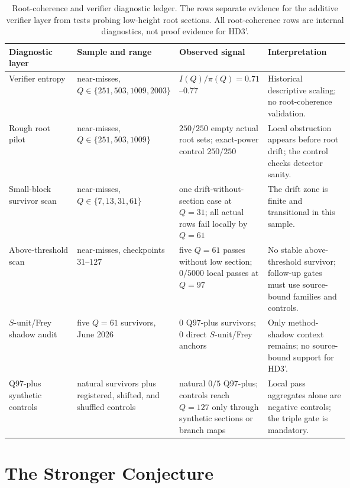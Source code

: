 \documentclass[11pt,a4paper]{article}
\begin{document}
\begin{table}[htb]
\centering
\small
\begin{tabularx}{\textwidth}{@{} >{\raggedright\arraybackslash}p{0.20\linewidth} >{\raggedright\arraybackslash}p{0.25\linewidth} >{\raggedright\arraybackslash}p{0.22\linewidth} >{\raggedright\arraybackslash}X @{}}
\toprule
Diagnostic layer & Sample and range & Observed signal & Interpretation \\
\midrule
Verifier entropy & 1000 near-misses, $Q\in\{251,503,1009,2003\}$ &
$I(Q)/\pi(Q)=0.71$--$0.77$ &
Historical descriptive scaling; no root-coherence validation. \\
\addlinespace
Rough root pilot & 250 near-misses, $Q\in\{251,503,1009\}$ &
$250/250$ empty actual root sets; exact-power control $250/250$ &
Local obstruction appears before root drift; the control checks detector sanity. \\
\addlinespace
Small-block survivor scan & 250 near-misses, $Q\in\{7,13,31,61\}$ &
one drift-without-section case at $Q=31$; all actual rows fail locally by $Q=61$ &
The drift zone is finite and transitional in this sample. \\
\addlinespace
Above-threshold scan & 5000 near-misses, checkpoints $31$--$127$ &
five $Q=61$ passes without low section; $0/5000$ local passes at $Q=97$ &
No stable above-threshold survivor; follow-up gates must use source-bound families and controls. \\
\addlinespace
$S$-unit/Frey shadow audit & five $Q=61$ survivors, June 2026 &
$0$ Q97-plus survivors; $0$ direct $S$-unit/Frey anchors &
Only method-shadow context remains; no source-bound support for HD3'. \\
\addlinespace
Q97-plus synthetic controls & natural survivors plus registered, shifted, and shuffled controls &
natural $0/5$ Q97-plus; controls reach $Q=127$ only through synthetic sections or branch maps &
Local pass aggregates alone are negative controls; the triple gate is mandatory. \\
\bottomrule
\end{tabularx}
\caption{Root-coherence and verifier diagnostic ledger. The rows separate
evidence for the additive verifier layer from tests probing low-height
root sections. All root-coherence rows are internal diagnostics, not
proof evidence for HD3'.}
\label{tab:root-diagnostics}
\end{table}

\section{The Stronger Conjecture}
\end{document}
